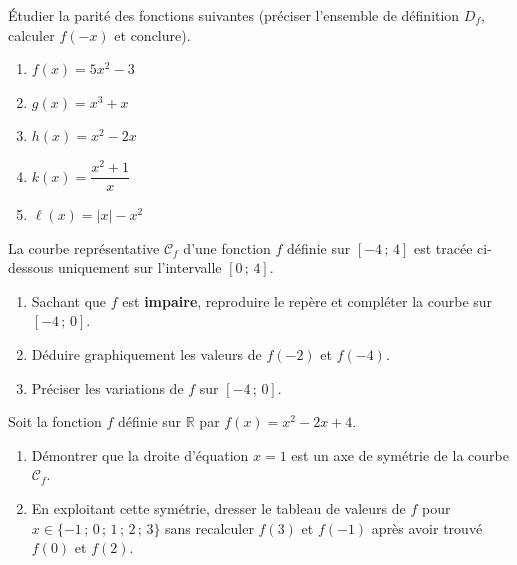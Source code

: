\documentclass[11pt]{article}
\begin{document}
\begin{exercice}
Étudier la parité des fonctions suivantes (préciser l'ensemble de définition $D_f$, calculer $f(-x)$ et conclure).
\begin{enumerate}
    \item $f(x)=5x^2-3$
    \item $g(x)=x^3+x$
    \item $h(x)=x^2-2x$
    \item $k(x)=\dfrac{x^2+1}{x}$
    \item $\ell(x)=|x|-x^2$
\end{enumerate}
\end{exercice}

\begin{exercice}
La courbe représentative $\mathcal{C}_f$ d'une fonction $f$ définie sur $[-4\,;\,4]$ est tracée ci-dessous uniquement sur l'intervalle $[0\,;\,4]$.
\begin{center}
\end{center}
\begin{enumerate}
    \item Sachant que $f$ est \textbf{impaire}, reproduire le repère et compléter la courbe sur $[-4\,;\,0]$.
    \item Déduire graphiquement les valeurs de $f(-2)$ et $f(-4)$.
    \item Préciser les variations de $f$ sur $[-4\,;\,0]$.
\end{enumerate}
\end{exercice}

\begin{exercice}
Soit la fonction $f$ définie sur $\mathbb{R}$ par $f(x)=x^2-2x+4$.
\begin{enumerate}
    \item Démontrer que la droite d'équation $x=1$ est un axe de symétrie de la courbe $\mathcal{C}_f$.
    \item En exploitant cette symétrie, dresser le tableau de valeurs de $f$ pour $x \in \{-1\,;\,0\,;\,1\,;\,2\,;\,3\}$ sans recalculer $f(3)$ et $f(-1)$ après avoir trouvé $f(0)$ et $f(2)$.
\end{enumerate}
\end{exercice}
\end{document}
